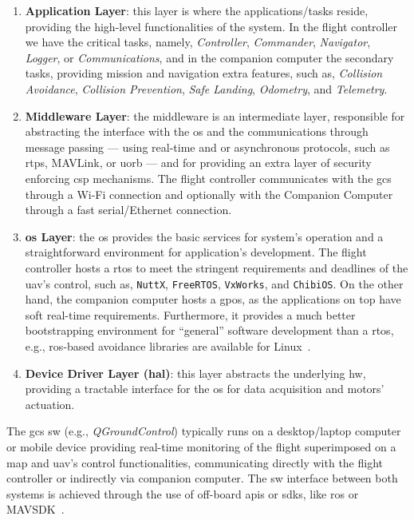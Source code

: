 \begin{enumerate}
\item \textbf{Application Layer}: this layer is where the applications/tasks
  reside, providing the high-level functionalities of the system. In the flight
  controller we have the critical tasks, namely,
  \emph{Controller}, \emph{Commander}, \emph{Navigator}, \emph{Logger},
  or \emph{Communications}, and in the companion computer the secondary tasks,
  providing mission and navigation extra features, such as, \emph{Collision
    Avoidance}, \emph{Collision Prevention}, \emph{Safe Landing},
  \emph{Odometry}, and \emph{Telemetry}.
%
\item \textbf{Middleware Layer}: the middleware is an intermediate layer,
  responsible for abstracting the interface with the \gls{os} and the
  communications through message passing --- using real-time and or asynchronous
  protocols, such as \gls{rtps}, MAVLink, or \gls{uorb} --- and for providing
  an extra layer of security enforcing \gls{csp} mechanisms. The flight
  controller communicates with the \gls{gcs} through a Wi-Fi connection and
  optionally with the Companion Computer through a fast serial/Ethernet
  connection.
%
\item \textbf{\gls{os} Layer}: the \gls{os} provides the basic services for
  system's operation and a straightforward environment for application's
  development. The flight controller hosts a \gls{rtos} to meet the stringent
  requirements and deadlines of the \gls{uav}'s control, such as,
  \lstinline{NuttX}, \lstinline{FreeRTOS}, \lstinline{VxWorks}, and \lstinline{ChibiOS}. On
  the other hand, the companion computer hosts a \gls{gpos}, as the applications
  on top have soft real-time requirements. Furthermore, it provides a much
  better bootstrapping environment for ``general'' software development than a
  \gls{rtos}, e.g., \gls{ros}-based avoidance libraries are available for Linux~\cite{px4-sysArch}.
%
\item \textbf{Device Driver Layer (\gls{hal})}: this layer abstracts the
  underlying \gls{hw}, providing a tractable interface for the \gls{os} for data
  acquisition and motors' actuation.
\end{enumerate}

The \gls{gcs} \gls{sw} (e.g., \emph{QGroundControl}) typically runs on a desktop/laptop computer or mobile
device providing real-time monitoring of the flight superimposed on a map and
\gls{uav}'s control functionalities, communicating directly with the flight
controller or indirectly via companion computer. The
\gls{sw} interface between both systems is achieved through the use of off-board
\glspl{api} or \glspl{sdk}, like \gls{ros} or MAVSDK~\cite{px4-sysArch}. 

